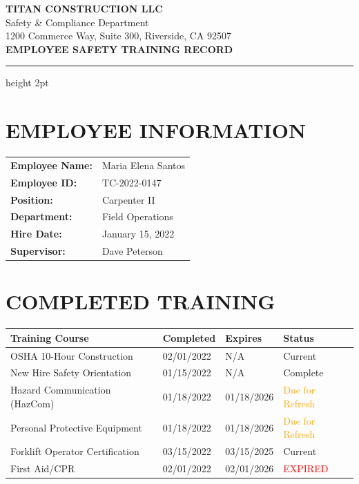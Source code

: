 \documentclass[11pt]{article}
\begin{document}
\begin{center}
{\Large\bfseries\color{titanblue} TITAN CONSTRUCTION LLC}\\[0.3em]
{\small Safety \& Compliance Department}\\
{\small 1200 Commerce Way, Suite 300, Riverside, CA 92507}\\[1em]
{\LARGE\bfseries EMPLOYEE SAFETY TRAINING RECORD}
\end{center}

\vspace{0.5em}
\hrule height 2pt
\vspace{1em}

\section*{EMPLOYEE INFORMATION}

\begin{tabular}{@{}p{4cm}p{10cm}@{}}
\textbf{Employee Name:} & Maria Elena Santos \\
\textbf{Employee ID:} & TC-2022-0147 \\
\textbf{Position:} & Carpenter II \\
\textbf{Department:} & Field Operations \\
\textbf{Hire Date:} & January 15, 2022 \\
\textbf{Supervisor:} & Dave Peterson \\
\end{tabular}

\vspace{1em}

\section*{COMPLETED TRAINING}

\begin{tabular}{@{}p{5cm}p{2.5cm}p{2.5cm}p{4cm}@{}}
\toprule
\textbf{Training Course} & \textbf{Completed} & \textbf{Expires} & \textbf{Status} \\
\midrule
OSHA 10-Hour Construction & 02/01/2022 & N/A & \textcolor{green!60!black}{Current} \\
New Hire Safety Orientation & 01/15/2022 & N/A & \textcolor{green!60!black}{Complete} \\
Hazard Communication (HazCom) & 01/18/2022 & 01/18/2026 & \textcolor{orange}{Due for Refresh} \\
Personal Protective Equipment & 01/18/2022 & 01/18/2026 & \textcolor{orange}{Due for Refresh} \\
Forklift Operator Certification & 03/15/2022 & 03/15/2025 & \textcolor{green!60!black}{Current} \\
First Aid/CPR & 02/01/2022 & 02/01/2026 & \textcolor{red}{EXPIRED} \\
\bottomrule
\end{tabular}
\end{document}
